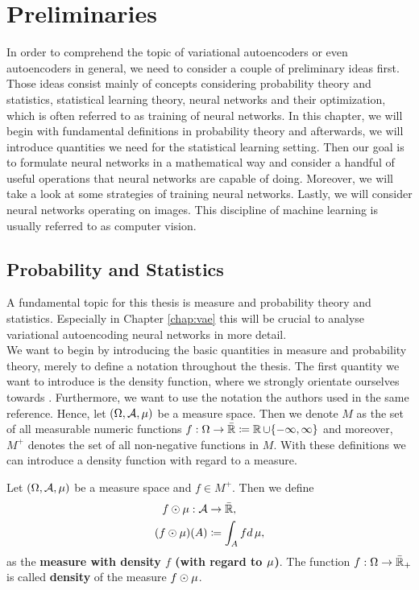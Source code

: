 \chapter{Preliminaries}\label{chap:preliminary}
In order to comprehend the topic of variational autoencoders or even autoencoders in general, we need to consider a couple of preliminary ideas first. Those ideas consist mainly of concepts considering probability theory and statistics, statistical learning theory, neural networks and their optimization, which is often referred to as training of neural networks.
In this chapter, we will begin with fundamental definitions in probability theory and afterwards, we will introduce quantities we need for the statistical learning setting. Then our goal is to formulate neural networks in a mathematical way and consider a handful of useful operations that neural networks are capable of doing. Moreover, we will take a look at some strategies of training neural networks. Lastly, we will consider neural networks operating on images. This discipline of machine learning is usually referred to as computer vision.


\section{Probability and Statistics}\label{sec:preliminary_prob}
A fundamental topic for this thesis is measure and probability theory and statistics. Especially in Chapter \ref{chap:vae} this will be crucial to analyse variational autoencoding neural networks in more detail.\\
We want to begin by introducing the basic quantities in measure and probability theory, merely to define a notation throughout the thesis. The first quantity we want to introduce is the density function, where we strongly orientate ourselves towards \cite[Chapter~2 \& Chapter~3]{meintrup2006stochastik}. Furthermore, we want to use the notation the authors used in the same reference. Hence, let $(\Omega, \operatorname{\mathcal{A}}, \operatorname{\mu})$ be a measure space. Then we denote $M$ as the set of all measurable numeric functions $f:\Omega\to \bar{\operatorname{\mathbb{R}}}\coloneqq \operatorname{\mathbb{R}} \cup \{-\infty, \infty\}$ and moreover, $M^{+}$ denotes the set of all non-negative functions in $M$. With these definitions we can introduce a density function with regard to a measure.

\begin{definition}\label{def:density}
Let $(\Omega, \operatorname{\mathcal{A}}, \operatorname{\mu})$ be a measure space and $f\in M^{+}$. Then we define
\begin{align*}
f \odot \mu: \operatorname{\mathcal{A}} &\to \bar{\operatorname{\mathbb{R}}},\\
(f \odot \mu) (A) &\coloneqq \int_{A}fd\operatorname{\mu},
\end{align*}
as the \textbf{measure with density $f$ (with regard to $\operatorname{\mu}$)}. The function $f:\Omega \to \bar{\operatorname{\mathbb{R}}}_{+}$ is called \textbf{density} of the measure $f\odot \operatorname{\mu}$.
\end{definition}

